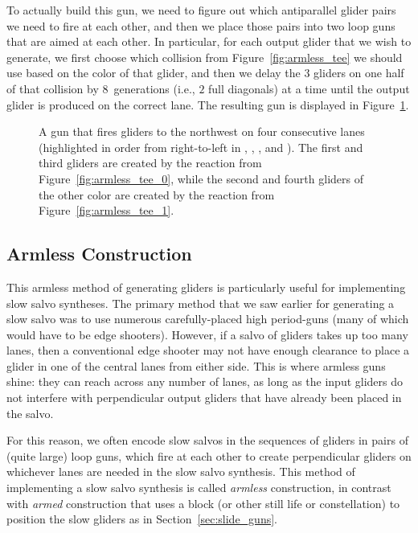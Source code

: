To actually build this gun, we need to figure out which antiparallel glider pairs we need to fire at each other, and then we place those pairs into two loop guns that are aimed at each other. In particular, for each output glider that we wish to generate, we first choose which collision from Figure~\ref{fig:armless_tee} we should use based on the color of that glider, and then we delay the $3$ gliders on one half of that collision by $8$~generations (i.e., $2$ full diagonals) at a time until the output glider is produced on the correct lane. The resulting gun is displayed in Figure~\ref{fig:armless_4_lane_gun}.

\begin{figure}[!htb]
	\centering
	\caption{A gun that fires gliders to the northwest on four consecutive lanes (highlighted in order from right-to-left in , , , and ). The first and third gliders are created by the reaction from Figure~\ref{fig:armless_tee_0}, while the second and fourth gliders of the other color are created by the reaction from Figure~\ref{fig:armless_tee_1}.}\label{fig:armless_4_lane_gun}
\end{figure}


\subsection{Armless Construction}\label{sec:armless_construction_subsec}

This armless method of generating gliders is particularly useful for implementing slow salvo syntheses. The primary method that we saw earlier for generating a slow salvo was to use numerous carefully-placed high period-guns (many of which would have to be edge shooters). However, if a salvo of gliders takes up too many lanes, then a conventional edge shooter may not have enough clearance to place a glider in one of the central lanes from either side. This is where armless guns shine: they can reach across any number of lanes, as long as the input gliders do not interfere with perpendicular output gliders that have already been placed in the salvo.

For this reason, we often encode slow salvos in the sequences of gliders in pairs of (quite large) loop guns, which fire at each other to create perpendicular gliders on whichever lanes are needed in the slow salvo synthesis. This method of implementing a slow salvo synthesis is called \emph{armless} construction, in contrast with \emph{armed} construction that uses a block (or other still life or constellation) to position the slow gliders as in Section~\ref{sec:slide_guns}.

